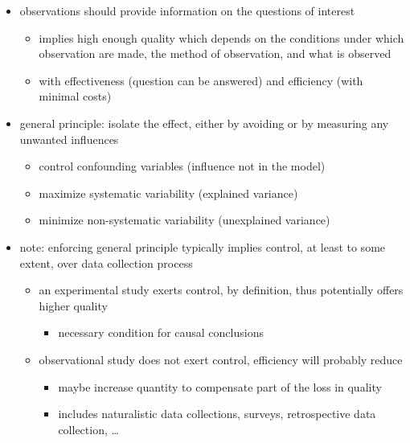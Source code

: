 \documentclass[]{article}
\providecommand{\tightlist}{%
  \setlength{\itemsep}{0pt}\setlength{\parskip}{0pt}}
\begin{document}
\begin{itemize}
\tightlist
\item
  observations should provide information on the questions of interest

  \begin{itemize}
  \tightlist
  \item
    implies high enough quality which depends on the conditions under
    which observation are made, the method of observation, and what is
    observed
  \item
    with effectiveness (question can be answered) and efficiency (with
    minimal costs) 
  \end{itemize}
\item
  general principle: isolate the effect, either by avoiding or by
  measuring any unwanted influences

  \begin{itemize}
  \tightlist
  \item
    control confounding variables (influence not in the model)
  \item
    maximize systematic variability (explained variance)
  \item
    minimize non-systematic variability (unexplained variance) \\
  \end{itemize}
\item
  note: enforcing general principle typically implies control, at least
  to some extent, over data collection process

  \begin{itemize}
  \tightlist
  \item
    an experimental study exerts control, by definition, thus
    potentially offers higher quality

    \begin{itemize}
    \tightlist
    \item
      necessary condition for causal conclusions
    \end{itemize}
  \item
    observational study does not exert control, efficiency will probably
    reduce

    \begin{itemize}
    \tightlist
    \item
      maybe increase quantity to compensate part of the loss in quality
    \item
      includes naturalistic data collections, surveys, retrospective
      data collection, \ldots{}
    \end{itemize}
  \end{itemize}
\end{itemize}
\end{document}
